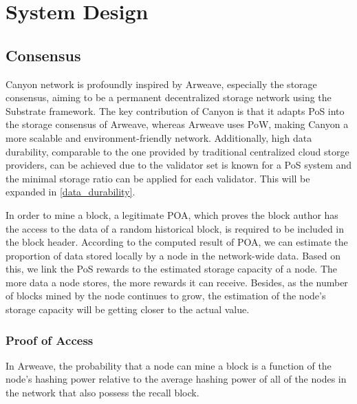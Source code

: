 \documentclass[]{article}
\begin{document}


\section{System Design}

\subsection{Consensus}

Canyon network is profoundly inspired by Arweave, especially the storage consensus, aiming to be a permanent decentralized storage network using the Substrate framework. The key contribution of Canyon is that it adapts PoS into the storage consensus of Arweave, whereas Arweave uses PoW, making Canyon a more scalable and environment-friendly network. Additionally, high data durability, comparable to the one provided by traditional centralized cloud storge providers, can be achieved due to the validator set is known for a PoS system and the minimal storage ratio can be applied for each validator. This will be expanded in \ref{data_durability}.

In order to mine a block, a legitimate POA, which proves the block author has the access to the data of a random historical block, is required to be included in the block header. According to the computed result of POA, we can estimate the proportion of data stored locally by a node in the network-wide data. Based on this, we link the PoS rewards to the estimated storage capacity of a node. The more data a node stores, the more rewards it can receive. Besides, as the number of blocks mined by the node continues to grow, the estimation of the node's storage capacity will be getting closer to the actual value.

\subsubsection{Proof of Access}

In Arweave, the probability that a node can mine a block is a function of the node’s hashing power relative to the average hashing power of all of the nodes in the network that also possess the recall block.
\end{document}
